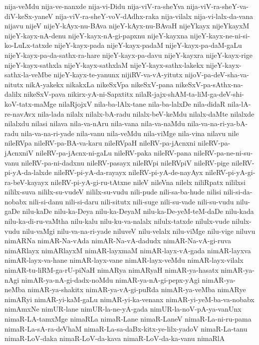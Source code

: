 {nija-veMdu
nija-ve-nanxde
nija-vi-Didu
nija-viV-ra-sheYva
nija-viV-ra-sheY-va-diV-keSx-yaneV
nija-viV-ra-sheY-voV-dAdhx-raka
nija-vilalx
nija-vi-lalx-da-vana
nijavu
nijeV
nijeY-kAyx-nu-BAva
nijeY-kAyx-nu-BAvaH
nijeYkayx
nijeYkayxM
nijeY-kayx-nA-denu
nijeY-kayx-nA-gi-papxnu
nijeY-kayxna
nijeY-kayx-ne-ni-si-ko-LuLx-tatxde
nijeY-kayx-pada
nijeY-kayx-padaM
nijeY-kayx-pa-daM-gaLu
nijeY-kayx-pa-da-sathx-ra-hare
nijeY-kayx-pa-davu
nijeY-kayxra
nijeY-kayx-rige
nijeY-kayx-sathxla
nijeY-kayx-sathxlaM
nijeY-kayx-sathx-lakekx
nijeY-kayx-sathx-la-veMbe
nijeY-kayx-te-yanunx
nijiRV-va-vA-yitutx
nijoV-pa-deV-sha-va-nitutx
nikA-yakekx
nikakxLa
nikeSxVpa
nikeSxV-pana
nikeSxV-pa-sAthx-na-dalilx
nikeSxV-pava
nikirx-yA-ni-Sapxtitx
nilaR-jajx-shAM-ta-liM-ga-deV-shi-koV-tatx-maMge
nilaRjojxV
nila-ba-lAlx-tane
nila-ba-lalxDe
nila-didaR
nila-lA-re-navAvx
nila-lada
nilalx
nilalx-bA-radu
nilalx-beV-keMdu
nilalx-daMte
nilalxde
nilalxdu
nilasi
nilava
nila-va-nAru
nila-vana
nila-va-naMdu
nila-va-na-ri-ya-bA-radu
nila-va-na-ri-yade
nila-vanu
nila-veMdu
nila-viMge
nila-vina
nilavu
nile
nileRVpa
nileRV-pa-BA-va-karu
nileRVpaH
nileRV-pa-jAcnxni
nileRV-pa-jAcnxniV
nileRV-pa-jAcnx-ni-gaLu
nileRV-paka
nileRV-pana
nileRV-pa-ne-ni-su-vanu
nileRV-pa-ni-dadxnu
nileRV-pasayx
nileRVpi
nileRVpiV
nileRV-pige
nileRV-pi-yA-da-lalxde
nileRV-pi-yA-da-rayayx
nileRV-pi-yA-de-nayAyx
nileRV-pi-yA-gi-ra-beV-kayayx
nileRV-pi-yA-gi-ru-tAtxne
nileV
nileVna
nilelx
niliRpatx
nililxsi
nililx-suva
nililx-su-vudeV
nililx-su-vudu
nili-pude
nili-sa-ba-hude
nilisi
nili-si-da-nobabx
nili-si-danu
nili-si-daru
nili-situtx
nili-suge
nili-su-vade
nili-su-vudu
nilu-gaDe
nilu-kaDe
nilu-ka-Deya
nilu-ka-DeyaM
nilu-ka-De-yeM-teM-daDe
nilu-kada
nilu-ka-di-ru-vaMtha
nilu-kalu
nilu-ku-va-nalalx
nilulx-tatxde
nilulx-vude
nilulx-vudu
nilu-vaMgi
nilu-va-na-ri-yade
niluveV
nilu-velalx
nilu-viMge
nilu-vige
niluvu
nimARNa
nimAR-Na-vAda
nimAR-Na-vA-dadudx
nimAR-Na-vA-gi-ruva
nimARlayx
nimARlayxM
nimAR-layxmaM
nimAR-layx-vA-gada
nimAR-layxva
nimAR-layx-va-hane
nimAR-layx-vane
nimAR-layx-veMdu
nimAR-layx-vilalx
nimAR-tu-liRM-ga-rU-piNaH
nimARya
nimARyaH
nimAR-ya-hasatx
nimAR-ya-nAgi
nimAR-ya-nA-gi-dadx-noMdu
nimAR-ya-nA-gi-pepx-yAgi
nimAR-ya-neMba
nimAR-ya-shakitx
nimAR-ya-vA-gi-puRda
nimAR-ya-veMba
nimARye
nimARyi
nimAR-yi-kaM-gaLu
nimAR-yi-ka-venanx
nimAR-yi-yeM-ba-va-nobabx
nimAmxNe
nimUR-lane
nimUR-la-ne-yA-gada
nimUR-la-noV-pA-ya-vanUnx
nimaR-LA-tamxMge
nimaRLa
nimaR-Lane
nimaR-LaneV
nimaR-La-ni-ru-pama
nimaR-La-sA-ra-deVhaM
nimaR-La-sa-daBx-kitx-ye-lilx-yadoV
nimaR-La-tanu
nimaR-LoV-daka
nimaR-LoV-da-kava
nimaR-LoV-da-ka-vanu
nimaRlA
}
